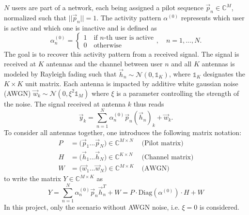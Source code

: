 \documentclass{article}
\begin{document}
	$N$ users are part of a network, each being assigned a pilot sequence $\vec p_n\in\mathbb{C}^M$, normalized such that $||\vec p_n||=1$. The activity pattern $\alpha^{(0)}$ represents which user is active and which one is inactive and is defined as 
	\begin{equation}
		\alpha_n^{(0)} =\begin{cases}
			1 \quad\text{if $n$-th user is active} \\ 0\quad\text{otherwise}
		\end{cases}, \quad n=1,...,N.
	\end{equation}
	The goal is to recover this activity pattern from a received signal. The signal is received at $K$ antennas and the channel between user $n$ and all $K$ antennas is modeled by Rayleigh fading such that $\vec h_n \sim \mathcal{N}(0,\mathds{1}_K)$, where $\mathds{1}_K$ designates the $K\times K$ unit matrix. Each antenna is impacted by additive white gaussian noise (AWGN) $\vec w_k\sim\mathcal{N}(0, \xi^2\mathds{1}_M)$ where $\xi$ is a parameter controlling the strength of the noise. The signal received at antenna $k$ thus reads
	\begin{equation}
		\vec y_k = \sum\limits_{n=1}^N \alpha_n^{(0)} \vec p_n (\vec h_n)_k + \vec{w}_k.
	\end{equation}
	To consider all antennas together, one introduces the following matrix notation:
	\begin{align}
		P &= \bigl(\vec p_1...\vec p_N\bigr)\in\mathbb{C}^{M\times N} &\text{ (Pilot matrix)}\\
		H &= \bigl(\vec h_1...\vec h_N\bigr)\in\mathbb{C}^{K\times N} &\text{ (Channel matrix)}\\
		W &= \bigl(\vec w_1...\vec w_N\bigr)\in\mathbb{C}^{M\times K} &\text{ (AWGN)}
	\end{align}
	to write the matrix $Y\in\mathbb{C}^{M\times K}$ as
	\begin{equation}
		Y = \sum\limits_{n=1}^N\alpha_n^{(0)}\vec p_n\vec h_n^T + W = P\cdot \mathrm{Diag}(\alpha^{(0)})\cdot H + W
	\end{equation}
	In this project, only the scenario without AWGN noise, i.e. $\xi=0$ is considered. 
	
\end{document}
